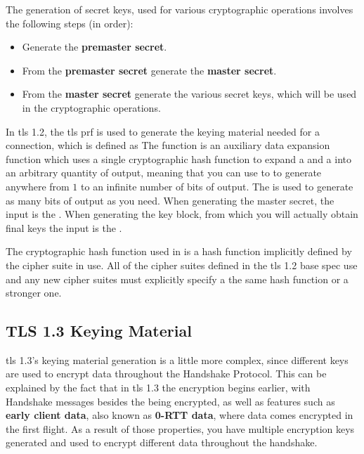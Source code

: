 \documentclass{llncs}
\begin{document}
The generation of secret keys, used for various cryptographic operations involves the
following steps (in order):

\begin{itemize}
  \item Generate the \textbf{premaster secret}.
  \item From the \textbf{premaster secret} generate the \textbf{master secret}.
  \item From the \textbf{master secret} generate the various secret keys, which
  will be used in the cryptographic operations.
\end{itemize}

In \gls{tls} 1.2, the \gls{tls} \gls{prf} is used to generate the keying material
needed for a connection, which is defined as 
The  function is an auxiliary data expansion function
which uses a single cryptographic hash function to expand a  and a 
into an arbitrary quantity of output, meaning that you can use to to generate
anywhere from $1$ to an infinite number of bits of output. The 
is used to generate as many bits of output as you need. When generating the
master secret, the  input is the .
When generating the key block, from which you will actually obtain final keys
the  input is the .

The cryptographic hash function used in  is
a hash function implicitly defined by the cipher suite in use. All of the cipher
suites defined in the \gls{tls} 1.2 base spec use  and any new
cipher suites must explicitly specify a the same hash function or a stronger one.

\subsection{TLS 1.3 Keying Material}

\gls{tls} 1.3's keying material generation is a little more complex, since different
keys are used to encrypt data throughout the Handshake Protocol. This can be
explained by the fact that in \gls{tls} 1.3 the encryption begins earlier, with
Handshake messages besides the  being encrypted,
as well as features such as \textbf{early client data}, also known as \textbf{0-RTT data},
where data comes encrypted in the first flight. As a result of those properties,
you have multiple encryption keys generated and used to encrypt different data
throughout the handshake.
\end{document}
